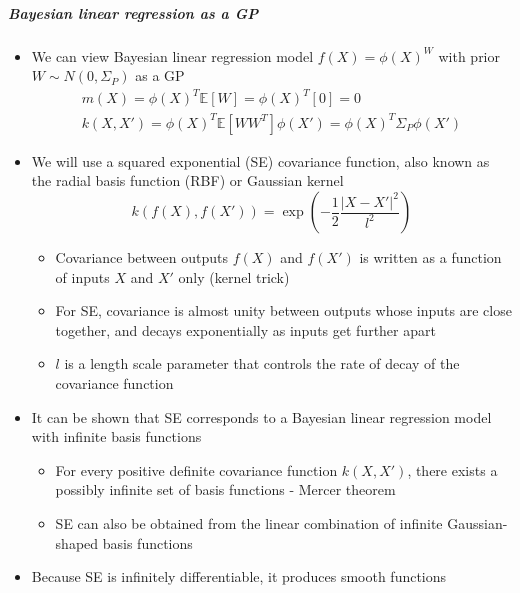 \documentclass[12pt]{article}
\begin{document}
\subparagraph{Bayesian linear regression as a GP}
\begin{itemize}
    \item We can view Bayesian linear regression model $f(X) = \phi(X)^W$ with prior $W \sim N(0, \Sigma_P)$ as a GP 
\begin{equation}
    \begin{aligned}
        m(X) = \phi(X)^T\mathbb{E}[W] = \phi(X)^T[0] = 0 \\
        k(X,X') = \phi(X)^T\mathbb{E}[WW^T]\phi(X') = \phi(X)^T\Sigma_P\phi(X')
    \end{aligned}
\end{equation}
    \item We will use a squared exponential (SE) covariance function, also known as the radial basis function (RBF) or Gaussian kernel
\begin{equation}
    k(f(X), f(X')) = \exp\left(-\frac{1}{2}\frac{|X - X'|^2}{l^2}\right)
\end{equation}
    \begin{itemize}
        \item Covariance between outputs $f(X)$ and $f(X')$ is written as a function of inputs $X$ and $X'$ only (kernel trick)
        \item For SE, covariance is almost unity between outputs whose inputs are close together, and decays exponentially as inputs get further apart
        \item $l$ is a length scale parameter that controls the rate of decay of the covariance function
    \end{itemize}
    \item It can be shown that SE corresponds to a Bayesian linear regression model with infinite basis functions
        \begin{itemize}
            \item For every positive definite covariance function $k(X,X')$, there exists a possibly infinite set of basis functions - Mercer theorem
            \item SE can also be obtained from the linear combination of infinite Gaussian-shaped basis functions
        \end{itemize}
    \item Because SE is infinitely differentiable, it produces smooth functions
\end{itemize}
\end{document}
